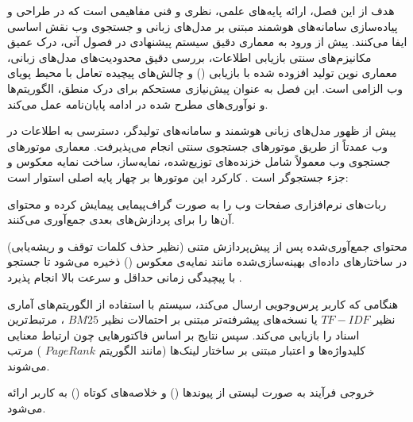 
هدف از این فصل، ارائه پایه‌های علمی، نظری و فنی مفاهیمی است که در طراحی و پیاده‌سازی سامانه‌های هوشمند مبتنی بر مدل‌های زبانی و جستجوی وب نقش اساسی ایفا می‌کنند. پیش از ورود به معماری دقیق سیستم پیشنهادی در فصول آتی، درک عمیق مکانیزم‌های سنتی بازیابی اطلاعات، بررسی دقیق محدودیت‌های مدل‌های زبانی، معماری نوین تولید افزوده شده با بازیابی () و چالش‌های پیچیده تعامل با محیط پویای وب الزامی است. این فصل به عنوان پیش‌نیازی مستحکم برای درک منطق، الگوریتم‌ها و نوآوری‌های مطرح شده در ادامه پایان‌نامه عمل می‌کند.


پیش از ظهور مدل‌های زبانی هوشمند و سامانه‌های تولیدگر، دسترسی به اطلاعات در وب عمدتاً از طریق موتورهای جستجوی سنتی انجام می‌پذیرفت. معماری موتورهای جستجوی وب معمولاً شامل خزنده‌های توزیع‌شده، نمایه‌ساز، ساخت نمایه معکوس و جزء جستجوگر است \cite{brin1998anatomy}. کارکرد این موتورها بر چهار پایه اصلی استوار است:


  ربات‌های نرم‌افزاری صفحات وب را به صورت گراف‌پیمایی پیمایش کرده و محتوای آن‌ها را برای پردازش‌های بعدی جمع‌آوری می‌کنند.

  محتوای جمع‌آوری‌شده پس از پیش‌پردازش متنی (نظیر حذف کلمات توقف و ریشه‌یابی) در ساختارهای داده‌ای بهینه‌سازی‌شده مانند نمایه‌ی معکوس () ذخیره می‌شود تا جستجو با پیچیدگی زمانی حداقل و سرعت بالا انجام پذیرد \cite{manning2008ir}.

  هنگامی که کاربر پرس‌وجویی ارسال می‌کند، سیستم با استفاده از الگوریتم‌های آماری نظیر $TF-IDF$ \cite{salton1988term} یا نسخه‌های پیشرفته‌تر مبتنی بر احتمالات نظیر $BM25$ \cite{robertson2009bm25}، مرتبط‌ترین اسناد را بازیابی می‌کند. سپس نتایج بر اساس فاکتورهایی چون ارتباط معنایی کلیدواژه‌ها و اعتبار مبتنی بر ساختار لینک‌ها (مانند الگوریتم $PageRank$ \cite{page1999pagerank}) مرتب می‌شوند.

  خروجی فرآیند به صورت لیستی از پیوندها () و خلاصه‌های کوتاه () به کاربر ارائه می‌شود.

